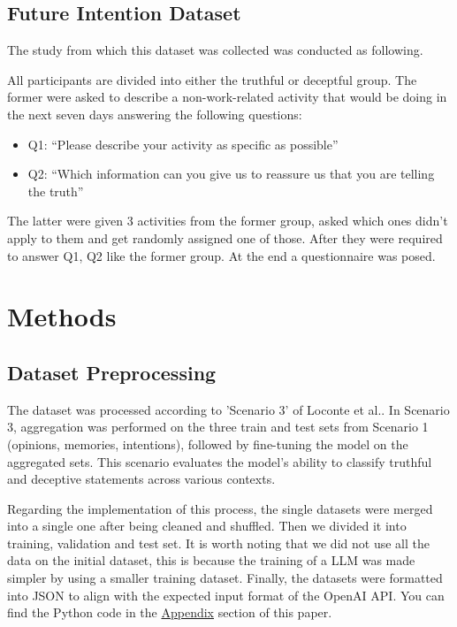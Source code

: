 \documentclass[10pt,twocolumn,letterpaper]{article}
\begin{document}
\subsection{Future Intention Dataset}

The study from which this dataset was collected was conducted as following.

All participants are divided into either the truthful or deceptful group.
The former were asked to describe a non-work-related activity that would be doing in the next seven days answering the following questions:

\begin{itemize}
    \item Q1: “Please describe your activity as specific as possible”
    \item Q2: “Which information can you give us to reassure us that you are telling the truth”
\end{itemize}

The latter were given 3 activities from the former group, asked which ones didn’t apply to them and get 
randomly assigned one of those. After they were required to answer Q1, Q2 like the former group.
At the end a questionnaire was posed.

\section{Methods}

\subsection{Dataset Preprocessing}


The dataset was processed according to 'Scenario 3' of Loconte et al.\cite{Loconte}.
In Scenario 3, aggregation was performed on the three train and test sets from Scenario 1 (opinions, memories, intentions), followed by fine-tuning the model on the aggregated sets. 
This scenario evaluates the model's ability to classify truthful and deceptive statements across various contexts.

Regarding the implementation of this process, the single datasets were merged into a single one after being cleaned and shuffled. Then we divided it into training, validation and test set.
It is worth noting that we did not use all the data on the initial dataset, this is because the training of a LLM was made simpler by using a smaller training dataset.
Finally, the datasets were formatted into JSON to align with the expected input format of the OpenAI API. You can find the Python code in the \hyperref[sec:appendix]{Appendix} section of this paper.
\end{document}

